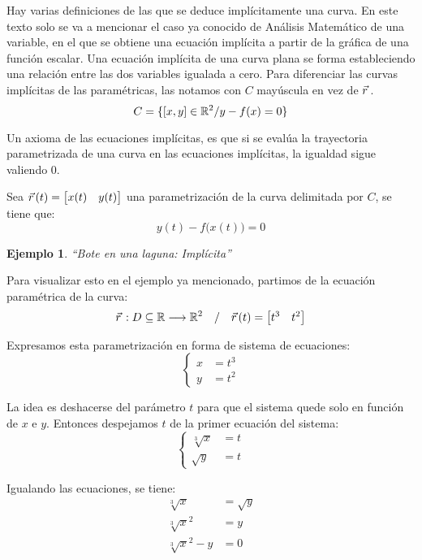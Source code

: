 \documentclass[a5paper,12pt,twoside]{book}
\newtheorem{example}{{Ejemplo}}[chapter]
\begin{document}
Hay varias definiciones de las que se deduce implícitamente una curva. En este texto solo se va a mencionar el caso ya conocido de Análisis Matemático de una variable, en el que se obtiene una ecuación implícita a partir de la gráfica de una función escalar. Una ecuación implícita de una curva plana se forma estableciendo una relación entre las dos variables igualada a cero. Para diferenciar las curvas implícitas de las paramétricas, las notamos con $C$ mayúscula en vez de $\vec{r}\hspace{0.05cm}$.
\[
C = \{ [x,y] \in \mathbb{R}^2 / y-f(x)=0 \}
\]

Un axioma de las ecuaciones implícitas, es que si se evalúa la trayectoria parametrizada de una curva en las ecuaciones implícitas, la igualdad sigue valiendo 0.

Sea $\vec{r}\hspace{0.05cm}(t) = \begin{bmatrix}x(t) & y(t)\end{bmatrix}$ una parametrización de la curva delimitada por $C$, se tiene que:
\[
y(t) - f \big( x(t) \big) =0
\]

\begin{example}
  ``Bote en una laguna: Implícita''
\end{example}

Para visualizar esto en el ejemplo ya mencionado, partimos de la ecuación paramétrica de la curva:
\[
  \vec{r}\hspace{0.05cm}:D \subseteq \mathbb{R} \longrightarrow \mathbb{R}^2 \quad / \quad \vec{r}\hspace{0.05cm}(t) =
  \begin{bmatrix}
      t^3 & t^2
  \end{bmatrix}
\]

Expresamos esta parametrización en forma de sistema de ecuaciones:
\[
\left\{
  \begin{aligned}
    x &= t^3
    \\
    y &= t^2
  \end{aligned}
\right.
\]

La idea es deshacerse del parámetro $t$ para que el sistema quede solo en función de $x$ e $y$. Entonces despejamos $t$ de la primer ecuación del sistema:
\[
  \left\{
    \begin{aligned}
      \sqrt[3]{x} &= t
      \\
      \sqrt{y} &= t
    \end{aligned}
  \right.
\]

Igualando las ecuaciones, se tiene:
\begin{align*}
  \sqrt[3]{x} &= \sqrt{y}
  \\
  \sqrt[3]{x}^2 &= y
  \\
  \sqrt[3]{x}^2 - y &= 0
\end{align*}
\end{document}
